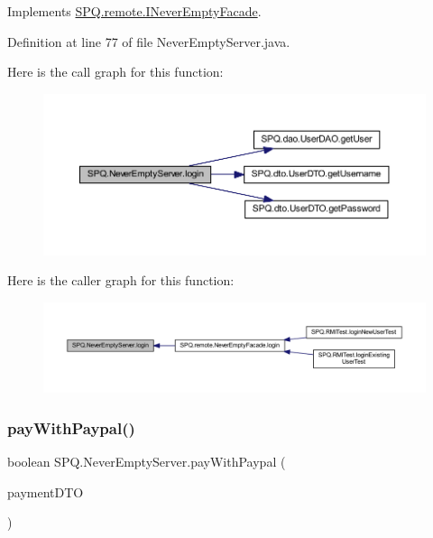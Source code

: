 Implements \mbox{\hyperlink{interface_s_p_q_1_1remote_1_1_i_never_empty_facade_a2440fa36695c63e4e4c30fc25965f853}{S\+P\+Q.\+remote.\+I\+Never\+Empty\+Facade}}.



Definition at line 77 of file Never\+Empty\+Server.\+java.

Here is the call graph for this function\+:
\nopagebreak
\begin{figure}[H]
\begin{center}
\leavevmode
\includegraphics[width=350pt]{class_s_p_q_1_1_never_empty_server_a79e3b01cc25be204f24e01c7fccbef13_cgraph}
\end{center}
\end{figure}
Here is the caller graph for this function\+:
\nopagebreak
\begin{figure}[H]
\begin{center}
\leavevmode
\includegraphics[width=350pt]{class_s_p_q_1_1_never_empty_server_a79e3b01cc25be204f24e01c7fccbef13_icgraph}
\end{center}
\end{figure}
\mbox{\label{class_s_p_q_1_1_never_empty_server_a954ea8c563055eae79564b357e557f85}} 
\subsubsection{\texorpdfstring{pay\+With\+Paypal()}{payWithPaypal()}}
{\footnotesize\ttfamily boolean S\+P\+Q.\+Never\+Empty\+Server.\+pay\+With\+Paypal (\begin{DoxyParamCaption}\item[{\mbox{\hyperlink{class_s_p_q_1_1dto_1_1_payment_d_t_o}{Payment\+D\+TO}}}]{payment\+D\+TO }\end{DoxyParamCaption})}



